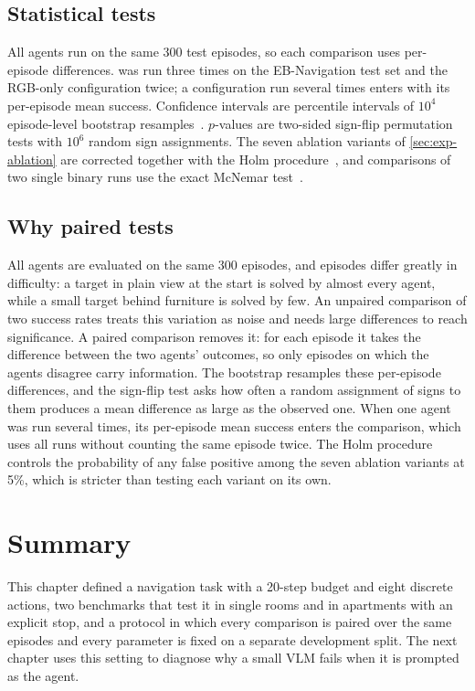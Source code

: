 \subsection{Statistical tests}
All agents run on the same 300 test episodes, so each comparison uses per-episode differences. \ours was run three
times on the EB-Navigation test set and the RGB-only configuration twice; a configuration run several times enters
with its per-episode mean success. Confidence intervals are percentile intervals of $10^4$ episode-level bootstrap
resamples~\cite{efron1993bootstrap}. $p$-values are two-sided sign-flip permutation tests with $10^6$ random sign
assignments. The seven ablation variants of \cref{sec:exp-ablation} are corrected together with the Holm
procedure~\cite{holm1979simple}, and comparisons of two single binary runs use the exact McNemar
test~\cite{mcnemar1947note}.

\subsection{Why paired tests}
All agents are evaluated on the same 300 episodes, and episodes differ greatly in difficulty: a target in plain
view at the start is solved by almost every agent, while a small target behind furniture is solved by few. An
unpaired comparison of two success rates treats this variation as noise and needs large differences to reach
significance. A paired comparison removes it: for each episode it takes the difference between the two agents'
outcomes, so only episodes on which the agents disagree carry information. The bootstrap resamples these
per-episode differences, and the sign-flip test asks how often a random assignment of signs to them produces a mean
difference as large as the observed one. When one agent was run several times, its per-episode mean success
enters the comparison, which uses all runs without counting the same episode twice. The Holm procedure controls the
probability of any false positive among the seven ablation variants at 5\%, which is stricter than testing each
variant on its own.

\section{Summary}
This chapter defined a navigation task with a 20-step budget and eight discrete actions, two benchmarks that test it
in single rooms and in apartments with an explicit stop, and a protocol in which every comparison is paired over the
same episodes and every parameter is fixed on a separate development split. The next chapter uses this setting to
diagnose why a small VLM fails when it is prompted as the agent.
